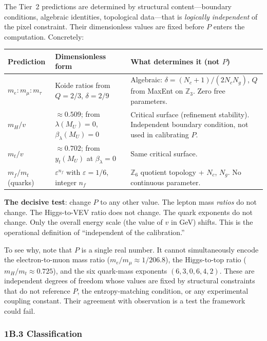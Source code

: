The Tier~2 predictions are determined by structural content---boundary conditions, algebraic identities, topological data---that is \emph{logically independent} of the pixel constraint. Their dimensionless values are fixed before \(P\) enters the computation. Concretely:

{\footnotesize
\def\LTcaptype{none}
\begin{longtable}[]{@{}>{\RaggedRight\arraybackslash}p{}>{\RaggedRight\arraybackslash}p{}>{\RaggedRight\arraybackslash}p{}@{}}
\toprule
Prediction & Dimensionless form & What determines it (not \(P\)) \\
\midrule
\endhead
\bottomrule
\endfoot
\(m_e : m_\mu : m_\tau\) & Koide ratios from \(Q = 2/3\), \(\delta = 2/9\) & Algebraic: \(\delta = (N_c+1)/(2N_cN_g)\), \(Q\) from MaxEnt on \(\mathbb{Z}_3\). Zero free parameters. \\
\(m_H / v\) & \(\approx 0.509\); from \(\lambda(M_U) = 0\), \(\beta_\lambda(M_U) = 0\) & Critical surface (refinement stability). Independent boundary condition, not used in calibrating \(P\). \\
\(m_t / v\) & \(\approx 0.702\); from \(y_t(M_U)\) at \(\beta_\lambda = 0\) & Same critical surface. \\
\(m_f / m_t\) (quarks) & \(\varepsilon^{n_f}\) with \(\varepsilon = 1/6\), integer \(n_f\) & \(\mathbb{Z}_6\) quotient topology + \(N_c\), \(N_g\). No continuous parameter. \\
\end{longtable}
}

\textbf{The decisive test}: change \(P\) to any other value. The lepton mass \emph{ratios} do not change. The Higgs-to-VEV ratio does not change. The quark exponents do not change. Only the overall energy scale (the value of \(v\) in GeV) shifts. This is the operational definition of ``independent of the calibration.''

To see why, note that \(P\) is a single real number. It cannot simultaneously encode the electron-to-muon mass ratio (\(m_e/m_\mu \approx 1/206.8\)), the Higgs-to-top ratio (\(m_H/m_t \approx 0.725\)), and the six quark-mass exponents \((6,3,0,6,4,2)\). These are independent degrees of freedom whose values are fixed by structural constraints that do not reference \(P\), the entropy-matching condition, or any experimental coupling constant. Their agreement with observation is a test the framework could fail.

\subsubsection{1B.3 Classification}\label{1b3-classification}

